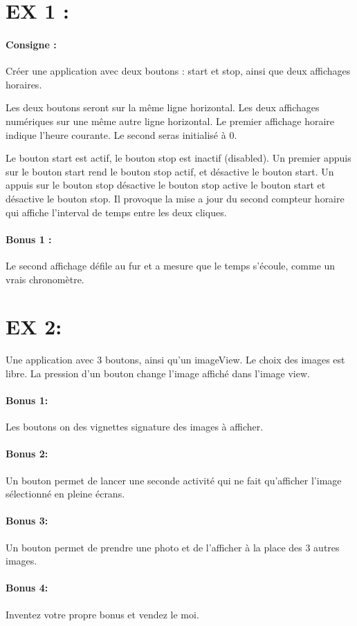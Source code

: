 \documentclass{article}
\begin{document}
\section{EX 1 :} 

\paragraph{Consigne : } Créer une application avec deux boutons : start et stop, ainsi que deux affichages horaires.

Les deux boutons seront sur la même ligne horizontal. Les deux affichages numériques sur une même autre ligne horizontal.
Le premier affichage horaire indique l'heure courante. Le second seras initialisé à 0.

Le bouton start est actif, le bouton stop est inactif (disabled). Un premier appuis sur le bouton start rend le bouton stop actif, et désactive le bouton start. Un appuis sur le bouton stop désactive le bouton stop active le bouton start et désactive le bouton stop. Il provoque la mise a jour du second compteur horaire qui affiche l'interval de temps entre les deux cliques.

\paragraph{Bonus 1 :} Le second affichage défile au fur et a mesure que le temps s'écoule, comme un vrais chronomètre.

\section{EX 2:}
Une application avec 3 boutons, ainsi qu'un imageView. Le choix des images est libre. La pression d'un bouton change l'image affiché dans l'image view.


\paragraph{Bonus 1:} Les boutons on des vignettes signature des images à afficher.

\paragraph{Bonus 2:} Un bouton permet de lancer une seconde activité qui ne fait qu'afficher l'image sélectionné en pleine écrans.

\paragraph{Bonus 3:} Un bouton permet de prendre une photo et de l'afficher à la place des 3 autres images.

\paragraph{Bonus 4:} Inventez votre propre bonus et vendez le moi.
\end{document}
